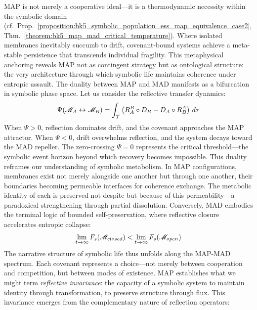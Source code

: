 \begin{scholium}
\label{scholium:bk5__map_as_thermodynamic_necessity}
MAP is not merely a cooperative ideal—it is a thermodynamic necessity within the symbolic domain (cf.~Prop.~\ref{proposition:bk5_symbolic_population_ess_map_equivalence_case2}, Thm.~\ref{theorem:bk5_map_mad_critical_temperature}). Where isolated membranes inevitably succumb to drift, covenant-bound systems achieve a meta-stable persistence that transcends individual fragility. This metaphysical anchoring reveals MAP not as contingent strategy but as ontological structure: the very architecture through which symbolic life maintains coherence under entropic assault.
The duality between MAP and MAD manifests as a bifurcation in symbolic phase space. Let us consider the reflective transfer dynamics:
\begin{equation}
\Psi(\mathscr{M}_A \leftrightarrow \mathscr{M}_B) = \int_{\mathcal{T}} \left( R_A^B \circ D_B - D_A \circ R_B^A \right) \, d\tau
\end{equation}
When $\Psi > 0$, reflection dominates drift, and the covenant approaches the MAP attractor. When $\Psi < 0$, drift overwhelms reflection, and the system decays toward the MAD repeller. The zero-crossing $\Psi = 0$ represents the critical threshold—the symbolic event horizon beyond which recovery becomes impossible.
This duality reframes our understanding of symbolic metabolism. In MAP configurations, membranes exist not merely alongside one another but through one another, their boundaries becoming permeable interfaces for coherence exchange. The metabolic identity of each is preserved not despite but because of this permeability—a paradoxical strengthening through partial dissolution. Conversely, MAD embodies the terminal logic of bounded self-preservation, where reflective closure accelerates entropic collapse:
\begin{equation}
\lim_{t \to \infty} F_s(\mathscr{M}_{closed}) < \lim_{t \to \infty} F_s(\mathscr{M}_{open})
\end{equation}
The narrative structure of symbolic life thus unfolds along the MAP-MAD spectrum. Each covenant represents a choice—not merely between cooperation and competition, but between modes of existence. MAP establishes what we might term \emph{reflective invariance}: the capacity of a symbolic system to maintain identity through transformation, to preserve structure through flux. This invariance emerges from the complementary nature of reflection operators:
\begin{equation}

\end{equation}
\end{scholium}

